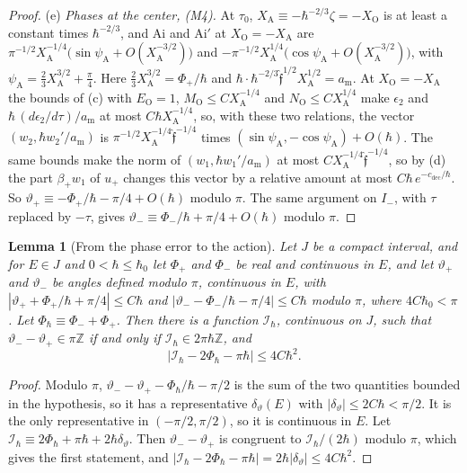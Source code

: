 \documentclass[aps,prd,onecolumn,tightenlines,nofootinbib,notitlepage,11pt,floatfix]{revtex4-2}
\theoremstyle{indentedtheorem}
\newtheorem{lemma}{Lemma}
\begin{document}
\begin{proof}
(e) \emph{Phases at the center, (M4).} At $\tau_0$, $X_\text{A}\equiv-\hbar^{-2/3}\zeta=-X_\text{O}$ is at least a constant times $\hbar^{-2/3}$, and $\mathrm{Ai}$ and $\mathrm{Ai}'$ at $X_\text{O}=-X_\text{A}$ are $\pi^{-1/2}X_\text{A}^{-1/4}\big(\sin\psi_\text{A}+O(X_\text{A}^{-3/2})\big)$ and $-\pi^{-1/2}X_\text{A}^{1/4}\big(\cos\psi_\text{A}+O(X_\text{A}^{-3/2})\big)$, with $\psi_\text{A}=\tfrac{2}{3}X_\text{A}^{3/2}+\tfrac{\pi}{4}$. Here $\tfrac{2}{3}X_\text{A}^{3/2}=\Phi_+/\hbar$ and $\hbar\cdot\hbar^{-2/3}\hat{\mathfrak{f}}^{1/2}X_\text{A}^{1/2}=a_\text{m}$. At $X_\text{O}=-X_\text{A}$ the bounds of (c) with $E_\text{O}=1$, $M_\text{O}\leq CX_\text{A}^{-1/4}$ and $N_\text{O}\leq CX_\text{A}^{1/4}$ make $\epsilon_2$ and $\hbar\,(d\epsilon_2/d\tau)/a_\text{m}$ at most $C\hbar X_\text{A}^{-1/4}$, so, with these two relations, the vector $(w_2,\hbar w_2'/a_\text{m})$ is $\pi^{-1/2}X_\text{A}^{-1/4}\hat{\mathfrak{f}}^{-1/4}$ times $(\sin\psi_\text{A},-\cos\psi_\text{A})+O(\hbar)$. The same bounds make the norm of $(w_1,\hbar w_1'/a_\text{m})$ at most $CX_\text{A}^{-1/4}\hat{\mathfrak{f}}^{-1/4}$, so by (d) the part $\beta_+w_1$ of $u_+$ changes this vector by a relative amount at most $C\hbar\,e^{-c_\text{dec}/\hbar}$. So $\vartheta_+\equiv-\Phi_+/\hbar-\pi/4+O(\hbar)$ modulo $\pi$. The same argument on $I_-$, with $\tau$ replaced by $-\tau$, gives $\vartheta_-\equiv\Phi_-/\hbar+\pi/4+O(\hbar)$ modulo $\pi$.
\end{proof}

\begin{lemma}[From the phase error to the action]\label{lem:phase_action}
Let $J$ be a compact interval, and for $E\in J$ and $0<\hbar\leq\hbar_0$ let $\Phi_+$ and $\Phi_-$ be real and continuous in $E$, and let $\vartheta_+$ and $\vartheta_-$ be angles defined modulo $\pi$, continuous in $E$, with $|\vartheta_++\Phi_+/\hbar+\pi/4|\leq C\hbar$ and $|\vartheta_--\Phi_-/\hbar-\pi/4|\leq C\hbar$ modulo $\pi$, where $4C\hbar_0<\pi$. Let $\Phi_\hbar\equiv\Phi_-+\Phi_+$. Then there is a function $\mathcal{I}_\hbar$, continuous on $J$, such that $\vartheta_--\vartheta_+\in\pi\mathbb{Z}$ if and only if $\mathcal{I}_\hbar\in2\pi\hbar\mathbb{Z}$, and
\begin{equation*}
    |\mathcal{I}_\hbar-2\Phi_\hbar-\pi\hbar| \leq 4C\hbar^2 .
\end{equation*}
\end{lemma}

\begin{proof}
Modulo $\pi$, $\vartheta_--\vartheta_+-\Phi_\hbar/\hbar-\pi/2$ is the sum of the two quantities bounded in the hypothesis, so it has a representative $\delta_\vartheta(E)$ with $|\delta_\vartheta|\leq2C\hbar<\pi/2$. It is the only representative in $(-\pi/2,\pi/2)$, so it is continuous in $E$. Let $\mathcal{I}_\hbar\equiv2\Phi_\hbar+\pi\hbar+2\hbar\delta_\vartheta$. Then $\vartheta_--\vartheta_+$ is congruent to $\mathcal{I}_\hbar/(2\hbar)$ modulo $\pi$, which gives the first statement, and $|\mathcal{I}_\hbar-2\Phi_\hbar-\pi\hbar|=2\hbar|\delta_\vartheta|\leq4C\hbar^2$.
\end{proof}
\end{document}

